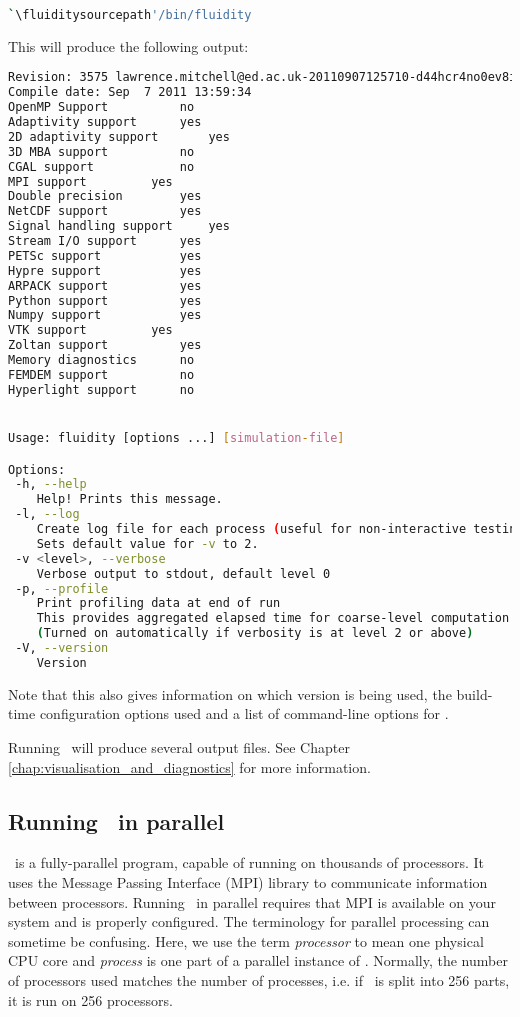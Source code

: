 \begin{lstlisting}[language=bash]
`\fluiditysourcepath'/bin/fluidity
\end{lstlisting}

This will produce the following output:

\begin{lstlisting}[language=Bash]
Revision: 3575 lawrence.mitchell@ed.ac.uk-20110907125710-d44hcr4no0ev8icc
Compile date: Sep  7 2011 13:59:34
OpenMP Support			no
Adaptivity support		yes
2D adaptivity support		yes
3D MBA support			no
CGAL support			no
MPI support			yes
Double precision		yes
NetCDF support			yes
Signal handling support		yes
Stream I/O support		yes
PETSc support			yes
Hypre support			yes
ARPACK support			yes
Python support			yes
Numpy support			yes
VTK support			yes
Zoltan support			yes
Memory diagnostics		no
FEMDEM support			no
Hyperlight support		no


Usage: fluidity [options ...] [simulation-file]

Options:
 -h, --help
    Help! Prints this message.
 -l, --log
    Create log file for each process (useful for non-interactive testing).
    Sets default value for -v to 2.
 -v <level>, --verbose
    Verbose output to stdout, default level 0
 -p, --profile
    Print profiling data at end of run
    This provides aggregated elapsed time for coarse-level computation
    (Turned on automatically if verbosity is at level 2 or above)
 -V, --version
    Version
\end{lstlisting}

Note that this also gives information on which version is being used, the
build-time configuration options used and a list of command-line options for
\fluidity. 

Running \fluidity\ will produce several output files. See Chapter \ref{chap:visualisation_and_diagnostics}
for more information.

\subsection{Running \fluidity\ in parallel}
\label{sec:running_fluidity_in_parallel}

\fluidity\ is a fully-parallel program, capable of running on thousands of
processors.  It uses the Message Passing Interface (MPI) library to communicate
information between processors. Running \fluidity\ in parallel requires that
MPI is available on your system and is properly configured. The terminology for
parallel processing can sometime be confusing.  Here, we use the term
\emph{processor} to mean one physical CPU core and \emph{process} is one part
of a parallel instance of \fluidity. Normally, the number of processors used
matches the number of processes, i.e. if \fluidity\ is split into 256 parts, it
is run on 256 processors.

